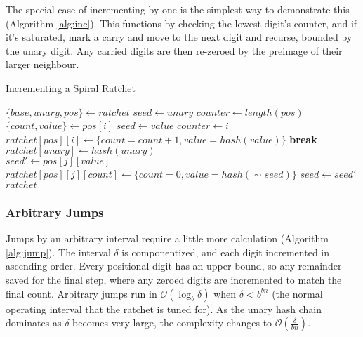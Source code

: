 \documentclass{article}
\begin{document}
	\FloatBarrier
	
	The special case of incrementing by one is the simplest way to demonstrate this (Algorithm \ref{alg:inc}). This functions by checking the lowest digit's counter, and if it's saturated, mark a carry and move to the next digit and recurse, bounded by the unary digit. Any carried digits are then re-zeroed by the preimage of their larger neighbour.
	
	\begin{algorithm}
		\caption{Incrementing a Spiral Ratchet}
		\label{alg:inc}

		\begin{algorithmic}[1]
				\State $\{base, unary, pos\} \gets ratchet$
				\State $seed \gets unary$
				\State $counter \gets length(pos)$
				\\
					\State $\{count, value\} \gets pos[i]$
					 
						\State $seed \gets value$
						\State $counter \gets i$
						\State $ratchet[pos][i] \gets \{ count = count + 1, value = hash(value)\}$
						\State \textbf{break}
					\EndIf
				\EndFor
				\\
				 
					\State $ratchet[unary] \gets hash(unary)$
				\EndIf
				\\
					 
						\State $seed' \gets pos[j][value]$
						\State $ratchet[pos][j][count] \gets \{count = 0, value = hash(\sim{seed})\}$
						\State $seed \gets seed'$
					\EndFor
				\EndIf
				\\
				\State $ratchet$
				\EndFunction
		\end{algorithmic}
	\end{algorithm}

	\subsubsection{Arbitrary Jumps}

	Jumps by an arbitrary interval require a little more calculation (Algorithm \ref{alg:jump}). The interval $\delta$ is componentized, and each digit incremented in ascending order. Every positional digit has an upper bound, so any remainder saved for the final step, where any zeroed digits are incremented to match the final count. Arbitrary jumps run in $\mathcal{O}(\log_{b} \delta)$ when $\delta < b^{bn}$ (the normal operating interval that the ratchet is tuned for). As the unary hash chain dominates as $\delta$ becomes very large, the complexity changes to $\mathcal{O}(\frac{\delta}{bn})$. %
\end{document}

